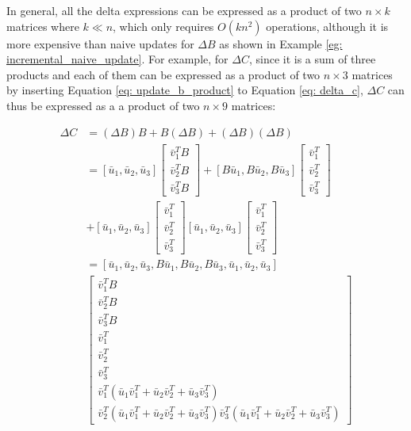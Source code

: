 In general, all the delta expressions can be expressed as a product of two $n \times k$ matrices where $k \ll n$, which only requires $O(kn^2)$ operations, although it is more expensive than naive updates for $\Delta B$ as shown in Example \ref{eg: incremental_naive_update}. For example, for $\Delta C$, since it is a sum of three products and each of them can be expressed as a product of two $n \times 3$ matrices by inserting Equation \ref{eq: update_b_product} to Equation \ref{eq: delta_c}, $\Delta C$ can thus be expressed as a a product of two $n \times 9$ matrices:


\begin{equation}
\begin{split}
    \Delta C &= (\Delta B) B + B (\Delta B) + (\Delta B) (\Delta B) \\&=[\bar{u}_1, \bar{u}_2, \bar{u}_3]
\begin{bmatrix}
    \bar{v}^T_1B \\
    \bar{v}^T_2B \\
    \bar{v}^T_3B 
\end{bmatrix}+[B\bar{u}_1, B\bar{u}_2, B\bar{u}_3]
\begin{bmatrix}
    \bar{v}^T_1 \\
    \bar{v}^T_2 \\
    \bar{v}^T_3 
\end{bmatrix}\\
&+[\bar{u}_1, \bar{u}_2, \bar{u}_3]
\begin{bmatrix}
    \bar{v}^T_1  \\
    \bar{v}^T_2  \\
    \bar{v}^T_3  
\end{bmatrix}
[\bar{u}_1, \bar{u}_2, \bar{u}_3]
\begin{bmatrix}
    \bar{v}^T_1  \\
    \bar{v}^T_2  \\
    \bar{v}^T_3  
\end{bmatrix}\\
&=[\bar{u}_1, \bar{u}_2, \bar{u}_3, B\bar{u}_1, B\bar{u}_2, B\bar{u}_3, \bar{u}_1, \bar{u}_2, \bar{u}_3]\\
&\begin{bmatrix}
    \bar{v}^T_1B \\
    \bar{v}^T_2B \\
    \bar{v}^T_3B \\
    \bar{v}^T_1  \\
    \bar{v}^T_2  \\
    \bar{v}^T_3  \\
    \bar{v}^T_1(\bar{u}_1\bar{v}^T_1 + \bar{u}_2\bar{v}^T_2 + \bar{u}_3\bar{v}^T_3)\\
    \bar{v}^T_2(\bar{u}_1\bar{v}^T_1 + \bar{u}_2\bar{v}^T_2 + \bar{u}_3\bar{v}^T_3)
    \bar{v}^T_3(\bar{u}_1\bar{v}^T_1 + \bar{u}_2\bar{v}^T_2 + \bar{u}_3\bar{v}^T_3)
\end{bmatrix}
\end{split}
\end{equation}

